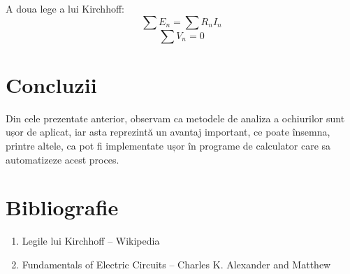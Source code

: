 \documentclass{article}
\begin{document}
\par A doua lege a lui Kirchhoff:
\[\sum E_n=\sum{R_nI_n}\]
\[\sum V_n=0\]


\section{Concluzii}
Din cele prezentate anterior, observam ca metodele de analiza a ochiurilor sunt ușor de aplicat, iar asta reprezintă un avantaj important, ce poate însemna, printre altele, ca pot fi implementate ușor în programe de calculator care sa automatizeze acest proces.


\section{Bibliografie}
\begin{enumerate}
    \item Legile lui Kirchhoff – Wikipedia
    \item Fundamentals of Electric Circuits – Charles K. Alexander and Matthew
\end{enumerate}
\end{document}
